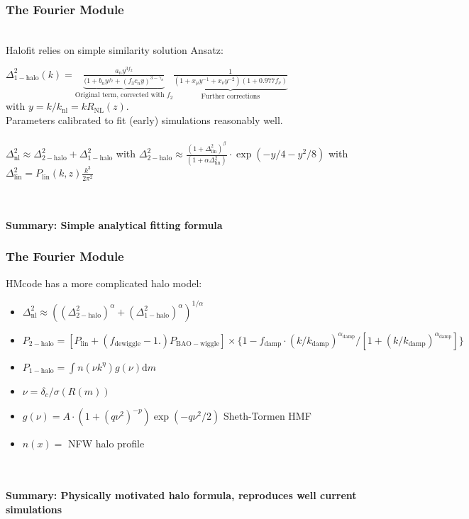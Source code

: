 \begin{frame}[fragile]
	\frametitle{The Fourier Module}

	\mbox{}\\
	{\Purple Halofit} relies on simple similarity solution Ansatz:
	
	$\Delta^2_\mathrm{1-halo}(k) = \underbrace{\frac{a_n y^{3 f_2}}{(1+b_n y^{f_2}+(f_3 c_n y)^{3-\gamma_n}}}_{\text{Original term, corrected with~}f_2} \underbrace{\frac{1}{(1+x_\mu y^{-1}+x_\nu y^{-2}) (1+0.977 f_\nu)}}_{\text{Further corrections}}$\\
	
	with $y = k/k_\mathrm{nl} = k R_\mathrm{NL}(z)$. \\
	Parameters calibrated to fit (early) simulations reasonably well. \\ \mbox{}\\
	
	$\Delta^2_\mathrm{nl} \approx \Delta^2_\mathrm{2-halo} +  \Delta^2_\mathrm{1-halo}$ with $\Delta^2_\mathrm{2-halo} \approx \frac{(1+\Delta^2_\mathrm{lin})^\beta}{(1+\alpha \Delta^2_\mathrm{lin})} \cdot \exp\left(-y/4-y^2/8\right)$
	with $\Delta^2_\mathrm{lin} = P_\mathrm{lin}(k,z) \frac{k^3}{2\pi^2}$
	
	\mbox{} \\ \mbox{} \\ 
	{\bf Summary: Simple analytical fitting formula} 
\end{frame}



\begin{frame}[fragile]
	\frametitle{The Fourier Module}

	{\Purple HMcode} has a more complicated halo model:
	\begin{itemize}
		\item $\Delta^2_\mathrm{nl} \approx \left(\left(\Delta^2_\mathrm{2-halo}\right)^\alpha +  \left(\Delta^2_\mathrm{1-halo}\right)^\alpha\right)^{1/\alpha}$
		\item $P_\mathrm{2-halo} = \left[P_\mathrm{lin} + (f_\mathrm{dewiggle}-1.) P_\mathrm{BAO-wiggle}\right] \times \{1-f_\mathrm{damp} \cdot (k/k_\mathrm{damp})^{\alpha_\mathrm{damp}}/[1+(k/k_\mathrm{damp})^{\alpha_\mathrm{damp}}]\}$
		\item $P_\mathrm{1-halo} = \int n(\nu k^\eta) g(\nu) \mathrm{d}m$
		\item  $\nu = \delta_c/\sigma(R(m))$
		\item $g(\nu) = A \cdot (1+(q \nu^2)^{-p}) \exp(-q \nu^2/2)$ Sheth-Tormen HMF
		\item $n(x) = $ NFW halo profile
	\end{itemize}
	
	\mbox{} \\ \mbox{} \\ 
	{\bf Summary: Physically motivated halo formula, reproduces well current simulations} 
\end{frame}

